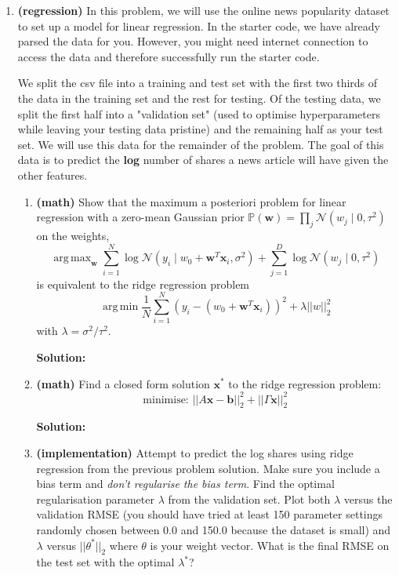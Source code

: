 \documentclass[letter,11pt]{article}
\newenvironment{solution}{
    \vspace{0.16in} {\bf Solution:}
    
}{
	\vspace{0.16in}
}
\DeclareMathOperator*{\argmax}{arg\,max}
\DeclareMathOperator*{\argmin}{arg\,min}
\begin{document}
\begin{enumerate}
    \newpage


    \item \textbf{(regression)} In this problem, we will use the online news popularity dataset to set up a model for linear regression. In the starter code, we have already parsed the data for you. However, you might need internet connection to access the data and therefore successfully run the starter code.

    We split the csv file into a training and test set with the first two thirds of the data in the training set and the rest for testing. Of the testing data, we split the first half into a "validation set" (used to optimise hyperparameters while leaving your testing data pristine) and the remaining half as your test set. We will use this data for the remainder of the problem. The goal of this data is to predict the \textbf{log} number of shares a news article will have given the other features.

    \begin{enumerate}
        \item \textbf{(math)} Show that the maximum a posteriori problem for linear regression with a zero-mean Gaussian prior $\mathbb{P}(\textbf{w}) = \prod_j \mathcal{N}(w_j \mid 0, \tau^2)$ on the weights, \[\argmax_{\textbf{w}} \sum_{i=1}^N \log \mathcal{N}(y_i \mid w_0 + \textbf{w}^T \textbf{x}_i, \sigma^2) + \sum_{j=1}^D \log \mathcal{N}(w_j \mid 0, \tau^2)\] is equivalent to the ridge regression problem \[\argmin \frac{1}{N} \sum_{i=1}^N (y_i - (w_0 + \textbf{w}^T \textbf{x}_i))^2 + \lambda ||w||_2^2\] with $\lambda = \sigma^2/\tau^2$.

        \begin{solution}
        \end{solution}

        \item \textbf{(math)} Find a closed form solution $\textbf{x}^*$ to the ridge regression problem: \[\text{minimise: } ||A\textbf{x} - \textbf{b}||_2^2 + ||\Gamma \textbf{x}||_2^2\]

        \begin{solution}
        \end{solution}

        \item \textbf{(implementation)} Attempt to predict the log shares using ridge regression from the previous problem solution. Make sure you include a bias term and \textit{don't regularise the bias term}. Find the optimal regularisation parameter $\lambda$ from the validation set. Plot both $\lambda$ versus the validation RMSE (you should have tried at least 150 parameter settings randomly chosen between 0.0 and 150.0 because the dataset is small) and $\lambda$ versus $||\theta^*||_2$ where $\theta$ is your weight vector. What is the final RMSE on the test set with the optimal $\lambda^*$?


\end{enumerate}
\end{enumerate}
\end{document}
